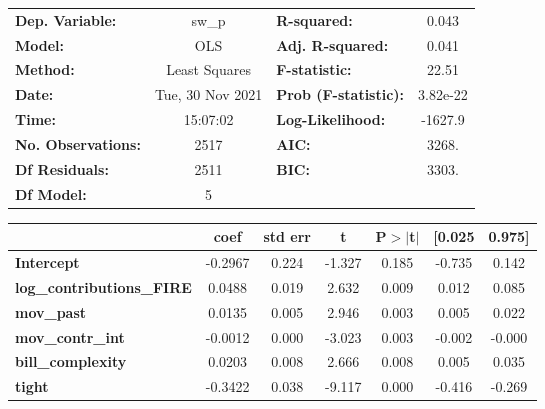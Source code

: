 \begin{center}
\begin{tabular}{lclc}
\toprule
\textbf{Dep. Variable:}           &      sw\_p       & \textbf{  R-squared:         } &     0.043   \\
\textbf{Model:}                   &       OLS        & \textbf{  Adj. R-squared:    } &     0.041   \\
\textbf{Method:}                  &  Least Squares   & \textbf{  F-statistic:       } &     22.51   \\
\textbf{Date:}                    & Tue, 30 Nov 2021 & \textbf{  Prob (F-statistic):} &  3.82e-22   \\
\textbf{Time:}                    &     15:07:02     & \textbf{  Log-Likelihood:    } &   -1627.9   \\
\textbf{No. Observations:}        &        2517      & \textbf{  AIC:               } &     3268.   \\
\textbf{Df Residuals:}            &        2511      & \textbf{  BIC:               } &     3303.   \\
\textbf{Df Model:}                &           5      & \textbf{                     } &             \\
\bottomrule
\end{tabular}
\begin{tabular}{lcccccc}
                                  & \textbf{coef} & \textbf{std err} & \textbf{t} & \textbf{P$> |$t$|$} & \textbf{[0.025} & \textbf{0.975]}  \\
\midrule
\textbf{Intercept}                &      -0.2967  &        0.224     &    -1.327  &         0.185        &       -0.735    &        0.142     \\
\textbf{log\_contributions\_FIRE} &       0.0488  &        0.019     &     2.632  &         0.009        &        0.012    &        0.085     \\
\textbf{mov\_past}                &       0.0135  &        0.005     &     2.946  &         0.003        &        0.005    &        0.022     \\
\textbf{mov\_contr\_int}          &      -0.0012  &        0.000     &    -3.023  &         0.003        &       -0.002    &       -0.000     \\
\textbf{bill\_complexity}         &       0.0203  &        0.008     &     2.666  &         0.008        &        0.005    &        0.035     \\
\textbf{tight}                    &      -0.3422  &        0.038     &    -9.117  &         0.000        &       -0.416    &       -0.269     \\

\end{tabular}
\end{center}
